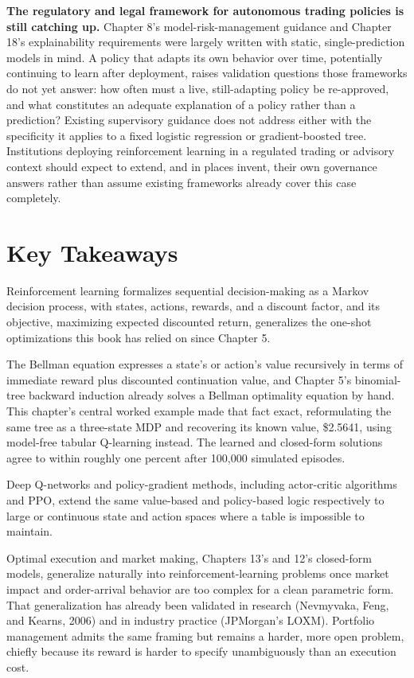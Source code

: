 \documentclass[../ai_in_finance]{subfiles}
\begin{document}
\textbf{The regulatory and legal framework for autonomous trading policies is still catching up.} Chapter 8's model-risk-management guidance and Chapter 18's explainability requirements were largely written with static, single-prediction models in mind. A policy that adapts its own behavior over time, potentially continuing to learn after deployment, raises validation questions those frameworks do not yet answer: how often must a live, still-adapting policy be re-approved, and what constitutes an adequate explanation of a policy rather than a prediction? Existing supervisory guidance does not address either with the specificity it applies to a fixed logistic regression or gradient-boosted tree. Institutions deploying reinforcement learning in a regulated trading or advisory context should expect to extend, and in places invent, their own governance answers rather than assume existing frameworks already cover this case completely.

\section{Key Takeaways}

Reinforcement learning formalizes sequential decision-making as a Markov decision process, with states, actions, rewards, and a discount factor, and its objective, maximizing expected discounted return, generalizes the one-shot optimizations this book has relied on since Chapter 5.

The Bellman equation expresses a state's or action's value recursively in terms of immediate reward plus discounted continuation value, and Chapter 5's binomial-tree backward induction already solves a Bellman optimality equation by hand. This chapter's central worked example made that fact exact, reformulating the same tree as a three-state MDP and recovering its known value, \$2.5641, using model-free tabular Q-learning instead. The learned and closed-form solutions agree to within roughly one percent after 100,000 simulated episodes.

Deep Q-networks and policy-gradient methods, including actor-critic algorithms and PPO, extend the same value-based and policy-based logic respectively to large or continuous state and action spaces where a table is impossible to maintain.

Optimal execution and market making, Chapters 13's and 12's closed-form models, generalize naturally into reinforcement-learning problems once market impact and order-arrival behavior are too complex for a clean parametric form. That generalization has already been validated in research (Nevmyvaka, Feng, and Kearns, 2006) and in industry practice (JPMorgan's LOXM). Portfolio management admits the same framing but remains a harder, more open problem, chiefly because its reward is harder to specify unambiguously than an execution cost.
\end{document}
